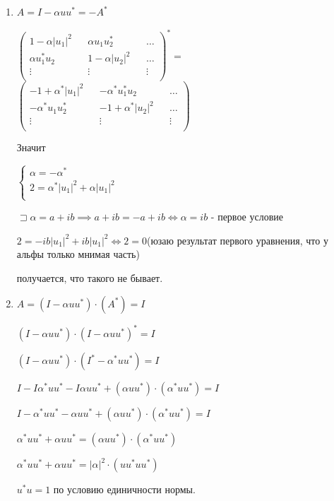 \documentclass[a4paper, 11pt]{article}
\begin{document}
\begin{enumerate}
\begin{enumerate}
			\item $A = I - \alpha u u^* = -A^*$
			
			$\begin{pmatrix}
				1 - \alpha |u_1|^2 && \alpha u_1 u_2^*  && \dots \\
				\alpha u_1^* u_2 && 1 - \alpha |u_2|^2   && \dots \\
				\vdots  && \vdots && \vdots \\
			\end{pmatrix}^* = $ $\begin{pmatrix}
				-1 + \alpha^* |u_1|^2 && -\alpha^* u_1^* u_2  && \dots \\
				-\alpha^* u_1 u_2^* && -1 + \alpha^* |u_2|^2   && \dots \\
				\vdots  && \vdots && \vdots \\
			\end{pmatrix}$
		
			Значит 
		
			$\begin{cases}
				\alpha = -\alpha^* \\
				2  = \alpha^* |u_1|^2 + \alpha |u_1|^2 \\
			\end{cases}$
		
			$\sqsupset \alpha = a + ib \implies a + ib = -a + ib \Longleftrightarrow \alpha = ib$ - первое условие
			
			$2 = -ib |u_1|^2 + ib|u_1|^2 \Longleftrightarrow 2 = 0$(юзаю результат первого уравнения, что у альфы только мнимая часть)
			
			получается, что такого не бывает.
			
			
			\item $A = (I - \alpha u u^*) \cdot (A^*) = I$
			
			$(I - \alpha u u^*) \cdot (I - \alpha u u^*)^* = I$
			
			$(I - \alpha u u^*) \cdot (I^* - \alpha^* u u^*) = I$
			
			$I - I \alpha^* u u^* - I \alpha u u^* + ( \alpha u u^*) \cdot (\alpha^* u u^*) = I$
			
			$I - \alpha^* u u^* - \alpha u u^* + ( \alpha u u^*) \cdot (\alpha^* u u^*) = I$
			
			$\alpha^* u u^* + \alpha u u^* = ( \alpha u u^*) \cdot (\alpha^* u u^*)$
			
			$\alpha^* u u^* + \alpha u u^* =  |\alpha|^2  \cdot (u u^* u u^*)$
			
			$u^* u = 1$ по условию единичности нормы.
			

\end{enumerate}
\end{enumerate}
\end{document}
